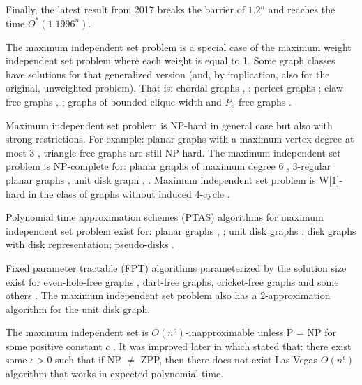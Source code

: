 Finally, the latest result \cite{xiao2017exact} from 2017 breaks the barrier of $1.2^n$ and reaches the time $O^*(1.1996^n)$.


The maximum independent set problem is a special case of the maximum weight independent set problem where each weight is equal to 1. Some graph classes have solutions for that generalized version (and, by implication, also for the original, unweighted problem). That is: chordal graphs \cite{gavril1972algorithms}, \cite{frank1976some}; perfect graphs \cite{grotschel1988stable}; claw-free graphs \cite{minty1980maximal}, \cite{nakamura2001revision};  graphs of bounded clique-width \cite{courcelle2000linear} and $P_5$-free graphs \cite{lokshantov2014independent}.

Maximum independent set problem is NP-hard \cite{garey1979computers} in general case but also with strong restrictions. For example: planar graphs with a maximum vertex degree at most $3$ \cite{garey1977rectilinear}, triangle-free graphs \cite{murphy1992computing} are still NP-hard. The maximum independent set problem is NP-complete for: planar graphs of maximum degree $6$ \cite{garey1974some}, $3$-regular planar graphs \cite{mohar2001face}, unit disk graph \cite{clark1990unit}, \cite{das2015approximation}.  Maximum independent set problem is W[1]-hard in the class of graphs without induced $4$-cycle \cite{husic2019independent}.


Polynomial time approximation schemes (PTAS) algorithms for maximum independent set problem exist for: planar graphs \cite{baker1994approximation}, \cite{williamson2011design}; unit disk graphs \cite{nieberg2005robust,das2015approximation}, disk graphs with disk representation\cite{erlebach2005polynomial}; pseudo-disks \cite{chan2009approximation}.


Fixed parameter tractable (FPT) algorithms parameterized by the solution size exist for even-hole-free graphs \cite{husic2019independent}, dart-free graphs, cricket-free graphs and some others \cite{bonnet2019maximum}. The maximum independent set problem also has a $2$-approximation algorithm for the unit disk graph.

The maximum independent set is $O(n^c)$-inapproximable unless P = NP for some positive constant $c$ \cite{berman1992complexity}.
It was improved later in \cite{zuckerman1996unapproximable} which stated that: there exist some $\epsilon > 0$ such that if NP $\neq$ ZPP, then there does not exist Las Vegas $O(n^\epsilon)$ algorithm that works in expected polynomial time.

